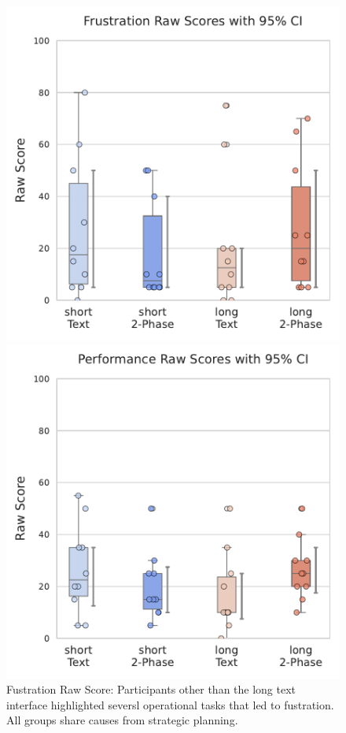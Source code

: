 \begin{figure}[h]
    \begin{minipage}[t]{0.45\textwidth}
        \centering
        \includegraphics[width=\textwidth, trim=0 13 0 13, clip]{content/image/cog/Frustration_scores.pdf}
        \captionsetup{width=0.9\textwidth, justification=justified} %
       \caption{Fustration Raw Score: Participants other than the long text interface highlighted seversl operational tasks that led to fustration. All groups share causes from strategic planning.}
        \label{fig:frustration_cog_score}
    \end{minipage}
    \hfill
    \begin{minipage}[t]{0.45\textwidth}
        \centering
        \includegraphics[width=\textwidth, trim=0 13 0 13, clip]{content/image/cog/Performance_scores.pdf}

\end{minipage}
\end{figure}
